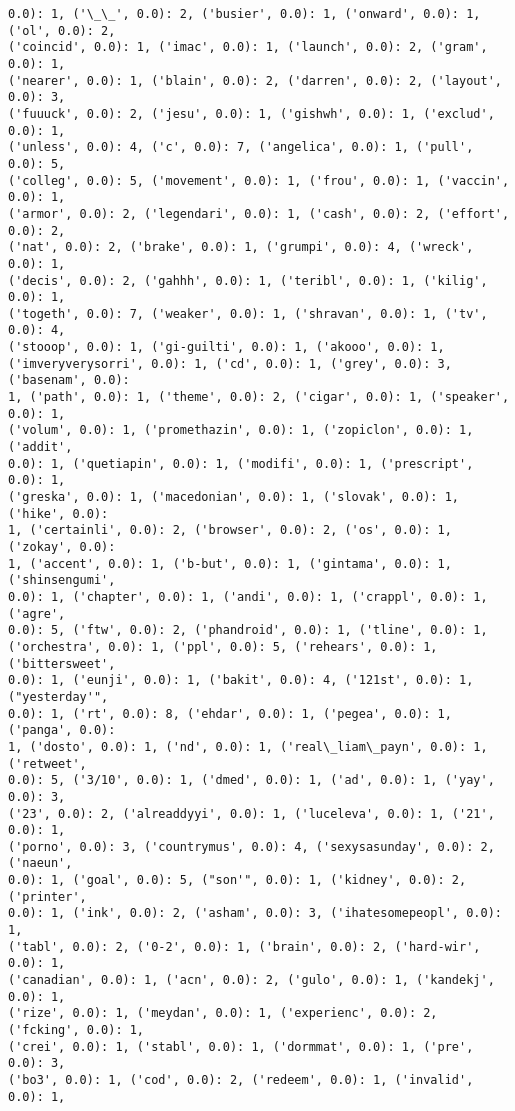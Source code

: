 \documentclass[11pt]{article}
\begin{document}
\begin{Verbatim}[commandchars=\\\{\}]
0.0): 1, ('\_\_', 0.0): 2, ('busier', 0.0): 1, ('onward', 0.0): 1, ('ol', 0.0): 2,
('coincid', 0.0): 1, ('imac', 0.0): 1, ('launch', 0.0): 2, ('gram', 0.0): 1,
('nearer', 0.0): 1, ('blain', 0.0): 2, ('darren', 0.0): 2, ('layout', 0.0): 3,
('fuuuck', 0.0): 2, ('jesu', 0.0): 1, ('gishwh', 0.0): 1, ('exclud', 0.0): 1,
('unless', 0.0): 4, ('c', 0.0): 7, ('angelica', 0.0): 1, ('pull', 0.0): 5,
('colleg', 0.0): 5, ('movement', 0.0): 1, ('frou', 0.0): 1, ('vaccin', 0.0): 1,
('armor', 0.0): 2, ('legendari', 0.0): 1, ('cash', 0.0): 2, ('effort', 0.0): 2,
('nat', 0.0): 2, ('brake', 0.0): 1, ('grumpi', 0.0): 4, ('wreck', 0.0): 1,
('decis', 0.0): 2, ('gahhh', 0.0): 1, ('teribl', 0.0): 1, ('kilig', 0.0): 1,
('togeth', 0.0): 7, ('weaker', 0.0): 1, ('shravan', 0.0): 1, ('tv', 0.0): 4,
('stooop', 0.0): 1, ('gi-guilti', 0.0): 1, ('akooo', 0.0): 1,
('imveryverysorri', 0.0): 1, ('cd', 0.0): 1, ('grey', 0.0): 3, ('basenam', 0.0):
1, ('path', 0.0): 1, ('theme', 0.0): 2, ('cigar', 0.0): 1, ('speaker', 0.0): 1,
('volum', 0.0): 1, ('promethazin', 0.0): 1, ('zopiclon', 0.0): 1, ('addit',
0.0): 1, ('quetiapin', 0.0): 1, ('modifi', 0.0): 1, ('prescript', 0.0): 1,
('greska', 0.0): 1, ('macedonian', 0.0): 1, ('slovak', 0.0): 1, ('hike', 0.0):
1, ('certainli', 0.0): 2, ('browser', 0.0): 2, ('os', 0.0): 1, ('zokay', 0.0):
1, ('accent', 0.0): 1, ('b-but', 0.0): 1, ('gintama', 0.0): 1, ('shinsengumi',
0.0): 1, ('chapter', 0.0): 1, ('andi', 0.0): 1, ('crappl', 0.0): 1, ('agre',
0.0): 5, ('ftw', 0.0): 2, ('phandroid', 0.0): 1, ('tline', 0.0): 1,
('orchestra', 0.0): 1, ('ppl', 0.0): 5, ('rehears', 0.0): 1, ('bittersweet',
0.0): 1, ('eunji', 0.0): 1, ('bakit', 0.0): 4, ('121st', 0.0): 1, ("yesterday'",
0.0): 1, ('rt', 0.0): 8, ('ehdar', 0.0): 1, ('pegea', 0.0): 1, ('panga', 0.0):
1, ('dosto', 0.0): 1, ('nd', 0.0): 1, ('real\_liam\_payn', 0.0): 1, ('retweet',
0.0): 5, ('3/10', 0.0): 1, ('dmed', 0.0): 1, ('ad', 0.0): 1, ('yay', 0.0): 3,
('23', 0.0): 2, ('alreaddyyi', 0.0): 1, ('luceleva', 0.0): 1, ('21', 0.0): 1,
('porno', 0.0): 3, ('countrymus', 0.0): 4, ('sexysasunday', 0.0): 2, ('naeun',
0.0): 1, ('goal', 0.0): 5, ("son'", 0.0): 1, ('kidney', 0.0): 2, ('printer',
0.0): 1, ('ink', 0.0): 2, ('asham', 0.0): 3, ('ihatesomepeopl', 0.0): 1,
('tabl', 0.0): 2, ('0-2', 0.0): 1, ('brain', 0.0): 2, ('hard-wir', 0.0): 1,
('canadian', 0.0): 1, ('acn', 0.0): 2, ('gulo', 0.0): 1, ('kandekj', 0.0): 1,
('rize', 0.0): 1, ('meydan', 0.0): 1, ('experienc', 0.0): 2, ('fcking', 0.0): 1,
('crei', 0.0): 1, ('stabl', 0.0): 1, ('dormmat', 0.0): 1, ('pre', 0.0): 3,
('bo3', 0.0): 1, ('cod', 0.0): 2, ('redeem', 0.0): 1, ('invalid', 0.0): 1,

\end{Verbatim}
\end{document}
